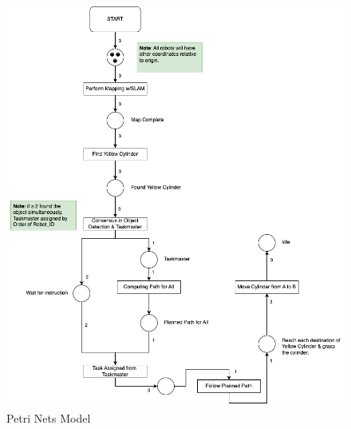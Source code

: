 \begin{figure}[H]
    \centering
    \includegraphics[width=1\linewidth]{assets/images/introduction/petri_nets.png}
    \caption{Petri Nets Model}
    \label{fig:petri_nets}
\end{figure}